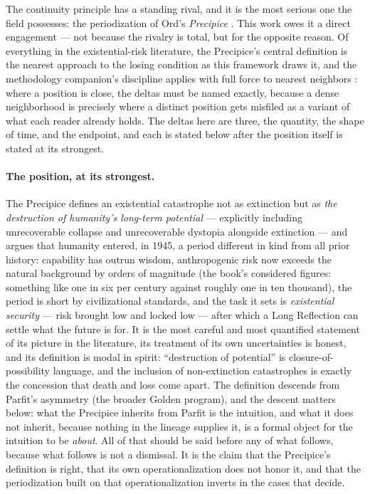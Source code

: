 \documentclass[11pt]{article}
\theoremstyle{plain}
\theoremstyle{definition}
\theoremstyle{remark}
\begin{document}
The continuity principle has a standing rival, and it is the most
serious one the field possesses: the periodization of Ord's
\emph{Precipice} \cite{Ord20}. This work owes it a direct engagement
--- not because the rivalry is total, but for the opposite reason. Of
everything in the existential-risk literature, the Precipice's central
definition is the nearest approach to the losing condition as this
framework draws it, and the methodology companion's discipline applies
with full force to nearest neighbors \cite{Ben26Method}: where a
position is close, the deltas must be named exactly, because a dense
neighborhood is precisely where a distinct position gets misfiled as a
variant of what each reader already holds. The deltas here are three, the quantity, the shape of time, and the endpoint, and each is
stated below after the position itself is stated at its strongest.

\paragraph{The position, at its strongest.} The Precipice defines an
existential catastrophe not as extinction but as \emph{the destruction
of humanity's long-term potential} --- explicitly including
unrecoverable collapse and unrecoverable dystopia alongside extinction
--- and argues that humanity entered, in 1945, a period different in
kind from all prior history: capability has outrun wisdom, anthropogenic
risk now exceeds the natural background by orders of magnitude (the
book's considered figures: something like one in six per century
against roughly one in ten thousand), the period is short by
civilizational standards, and the task it sets is \emph{existential
security} --- risk brought low and locked low --- after which a Long
Reflection can settle what the future is for. It is the most careful
and most quantified statement of its picture in the literature, its
treatment of its own uncertainties is honest, and its definition is
modal in spirit: ``destruction of potential'' is closure-of-possibility
language, and the inclusion of non-extinction catastrophes is exactly
the concession that death and loss come apart. The definition
descends from Parfit's asymmetry \cite{Parfit84}
(the broader Golden program), and the descent matters below:
what the Precipice inherits from Parfit is the intuition, and what it
does not inherit, because nothing in the lineage supplies it, is
a formal object for the intuition to be \emph{about}. All of that should be
said before any of what follows, because what follows is not a
dismissal. It is the claim that the Precipice's definition is right,
that its own operationalization does not honor it, and that the
periodization built on that operationalization inverts in the cases
that decide.
\end{document}
